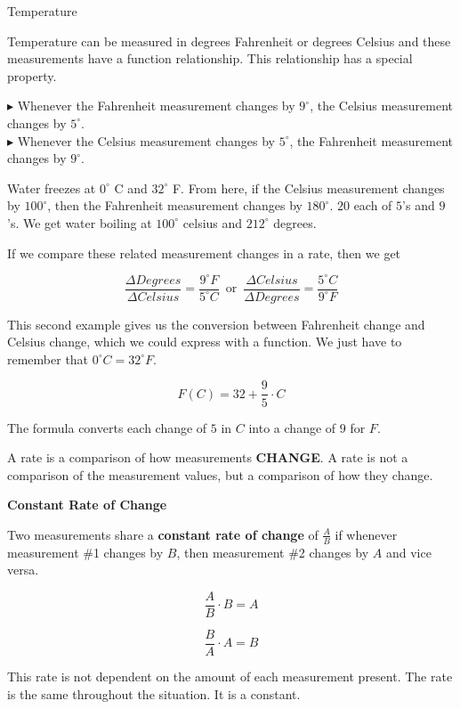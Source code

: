 \documentclass{ximera}
\begin{document}
\begin{example} Temperature


Temperature can be measured in degrees Fahrenheit or degrees Celsius and these measurements have a function relationship. This relationship has a special property.


$\blacktriangleright$ Whenever the Fahrenheit measurement changes by $9^{\circ}$, the Celsius measurement changes by $5^{\circ}$. \\
$\blacktriangleright$ Whenever the Celsius measurement changes by $5^{\circ}$, the Fahrenheit measurement changes by $9^{\circ}$. 



Water freezes at $0^{\circ}$ C and $32^{\circ}$ F.  From here, if the Celsius measurement changes by $100^{\circ}$, then the Fahrenheit measurement changes by $180^{\circ}$.  $20$ each of $5$'s and $9$'s. We get water boiling at $100^{\circ}$ celsius and $212^{\circ}$ degrees.


If we compare these related measurement changes in a rate, then we get

\[
\frac{\Delta Degrees}{\Delta Celsius} = \frac{9^{\circ}F}{5^{\circ}C} \, \text{ or } \, \frac{\Delta Celsius}{\Delta Degrees} = \frac{5^{\circ}C}{9^{\circ}F}
\]


\end{example} 


This second example gives us the conversion between Fahrenheit change and Celsius change, which we could express with a function.  We just have to remember that $0^{\circ}C = 32^{\circ}F$.

\[
F(C) = 32 + \frac{9}{5} \cdot C
\]


The formula converts each change of $5$ in $C$ into a change of $9$ for $F$.




A rate is a comparison of how measurements \textbf{\textcolor{purple!85!blue}{CHANGE}}. A rate is not a comparison of the measurement values, but a comparison of how they change. 



\begin{definition} \textbf{\textcolor{green!50!black}{Constant Rate of Change}} 


Two measurements share a \textbf{constant rate of change} of $\tfrac{A}{B}$ if whenever measurement \#1 changes by $B$, then measurement \#2 changes by $A$ and vice versa.

\[  \frac{A}{B} \cdot B = A \] 

\[  \frac{B}{A} \cdot A = B \] 


This rate is not dependent on the amount of each measurement present.  The rate is the same throughout the situation.  It is a constant.




\end{definition}
\end{document}
